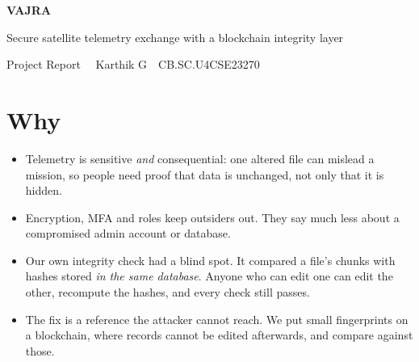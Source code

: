 \documentclass[10pt,a4paper]{article}
\newcommand{\authorname}{Karthik G}
\newcommand{\rollno}{CB.SC.U4CSE23270}
\begin{document}
\begin{center}
  {\headfont\bfseries\fontsize{22}{24}\selectfont\color{accent}VAJRA\par}
  \vspace{1pt}
  {\headfont\large Secure satellite telemetry exchange with a blockchain integrity layer\par}
  \vspace{3pt}
  {\headfont\footnotesize\color{ink!80} Project Report \ \textbullet\ \authorname\ \textbullet\ \rollno\par}
\end{center}
\vspace{-4pt}
\noindent{}

\section{Why}
\begin{itemize}
  \item Telemetry is sensitive \emph{and} consequential: one altered file can mislead a mission, so people need proof
        that data is unchanged, not only that it is hidden.
  \item Encryption, MFA and roles keep outsiders out. They say much less about a compromised admin account or database.
  \item Our own integrity check had a blind spot. It compared a file's chunks with hashes stored \emph{in the same database}.
        Anyone who can edit one can edit the other, recompute the hashes, and every check still passes.
  \item The fix is a reference the attacker cannot reach. We put small fingerprints on a blockchain, where records cannot be
        edited afterwards, and compare against those.
\end{itemize}
\end{document}
